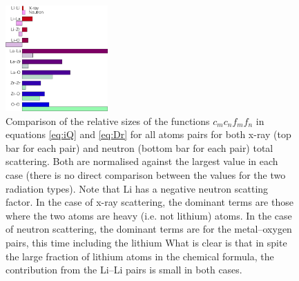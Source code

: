 \documentclass[twoside,twocolumn,9pt]{article}
\begin{document}
\begin{figure}[t]
\centering
\includegraphics[width=0.35\textwidth]{Pics/ccbb2.pdf}
\caption{Comparison of the relative sizes of the functions $c_m c_n f_m f_n$ in equations \ref{eq:iQ} and \ref{eq:Dr} for all atoms pairs for both x-ray (top bar for each pair) and neutron (bottom bar for each pair) total scattering. Both are normalised against the largest value in each case (there is no direct comparison between the values for the two radiation types). Note that Li has a negative neutron scatting factor. In the case of x-ray scattering, the dominant terms are those where the two atoms are heavy (i.e. not lithium) atoms. In the case of neutron scattering, the dominant terms are for the metal--oxygen pairs, this time including the lithium What is clear is that in spite the large fraction of lithium atoms in the chemical formula, the contribution from the Li--Li pairs is small in both cases.}
\label{fig:ccbb}
\end{figure}
\end{document}
